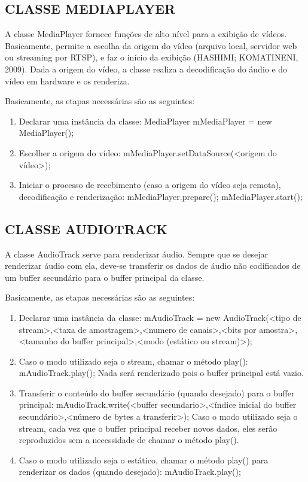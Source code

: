 \documentclass{acm_proc_article-sp}
\begin{document}
\subsection{CLASSE MEDIAPLAYER}
A classe MediaPlayer fornece funções de alto nível para a exibição de vídeos. Basicamente, permite a escolha da origem do vídeo (arquivo local, servidor web ou streaming por RTSP), e faz o início da exibição (HASHIMI; KOMATINENI, 2009). Dada a origem do vídeo, a classe realiza a decodificação do áudio e do vídeo em hardware e os renderiza.

Basicamente, as etapas necessárias são as seguintes:
\begin{enumerate}
 \item Declarar uma instância da classe:
MediaPlayer mMediaPlayer = new MediaPlayer();
 \item Escolher a origem do vídeo:
mMediaPlayer.setDataSource(<origem do vídeo>);
 \item Iniciar o processo de recebimento (caso a origem do vídeo seja remota), decodificação e renderização:
mMediaPlayer.prepare();
mMediaPlayer.start();
\end{enumerate}

\subsection{CLASSE AUDIOTRACK}
A classe AudioTrack serve para renderizar áudio. Sempre que se desejar renderizar áudio com ela, deve-se transferir os dados de áudio não codificados de um buffer secundário para o buffer principal da classe.

Basicamente, as etapas necessárias são as seguintes:
\begin{enumerate}
 \item Declarar uma instância da classe:
mAudioTrack = new AudioTrack(<tipo de stream>,<taxa de amostragem>,<numero de canais>,<bits por amostra>,<tamanho do buffer principal>,<modo (estático ou stream)>);
 \item Caso o modo utilizado seja o stream, chamar o método play():
mAudioTrack.play();
Nada será renderizado pois o buffer principal está vazio.
 \item Transferir o conteúdo do buffer secundário (quando desejado) para o buffer principal:
mAudioTrack.write(<buffer secundario>,<índice inicial do buffer secundário>,<número de bytes a transferir>);
Caso o modo utilizado seja o stream, cada vez que o buffer principal receber novos dados, eles serão reproduzidos sem a necessidade de chamar o método play().
 \item Caso o modo utilizado seja o estático, chamar o método play() para renderizar os dados (quando desejado):
mAudioTrack.play();
\end{enumerate}
\end{document}
